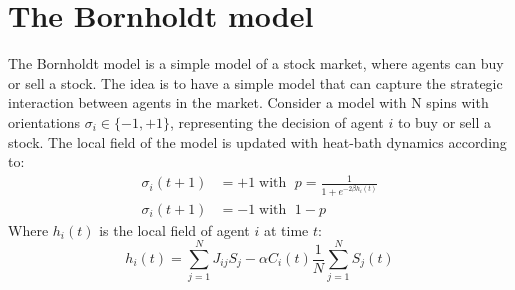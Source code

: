 \section{The Bornholdt model}
The Bornholdt model is a simple model of a stock market, where agents can buy or sell a stock. The idea is to have a simple model that can capture the strategic interaction between agents in the market. Consider a model with N spins with orientations $\sigma_i\in\{-1,+1\}$, representing the decision of agent $i$ to buy or sell a stock. The local field of the model is updated with heat-bath dynamics according to:
\begin{equation}
    \begin{aligned}
        \sigma_i(t+1) &= +1 \;\text{with }\; p = \frac{1}{1+e^{-2\beta h_i(t)}}\\
        \sigma_i(t+1) &= -1 \;\text{with }\; 1-p
    \end{aligned}
\end{equation}
Where $h_i(t)$ is the local field of agent $i$ at time $t$:
\begin{equation}
    h_i(t)=\sum_{j=1}^N J_{i j} S_j-\alpha C_i(t) \frac{1}{N} \sum_{j=1}^N S_j(t)
\end{equation}
